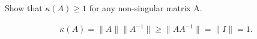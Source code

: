 \documentclass[10pt]{article}
\begin{document}
\begin{exercise}[6]  \label{exe:6}
Show that \(\kappa(A) \geq 1\) for any non-singular matrix A.
\end{exercise}
\begin{solution}[6]  \label{sol:6b}
\begin{align*}
\kappa(A) = \| A \| \| A^{-1}  \| \geq \| A A^{-1}   \| = \| I \| = 1
.
\end{align*}
\end{solution}
\end{document}
